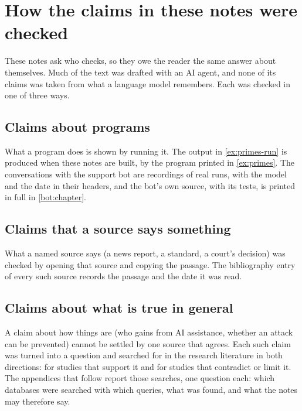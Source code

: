 
\chapter{How the claims in these notes were checked}
\label{app:checking}

These notes ask who checks, so they owe the reader the same answer
about themselves.
Much of the text was drafted with an AI agent, and none of its claims
was taken from what a language model remembers.
Each was checked in one of three ways.

\section{Claims about programs}
What a program does is shown by running it.
The output in \cref{ex:primes-run} is produced when these notes are
built, by the program printed in \cref{ex:primes}.
The conversations with the support bot are recordings of real runs,
with the model and the date in their headers, and the bot's own source,
with its tests, is printed in full in \cref{bot:chapter}.

\section{Claims that a source says something}
What a named source says (a news report, a standard, a court's
decision) was checked by opening that source and copying the passage.
The bibliography entry of every such source records the passage and the
date it was read.

\section{Claims about what is true in general}
A claim about how things are (who gains from AI assistance, whether an
attack can be prevented) cannot be settled by one source that agrees.
Each such claim was turned into a question and searched for in the
research literature in both directions: for studies that support it and
for studies that contradict or limit it.
The appendices that follow report those searches, one question each:
which databases were searched with which queries, what was found, and
what the notes may therefore say.

